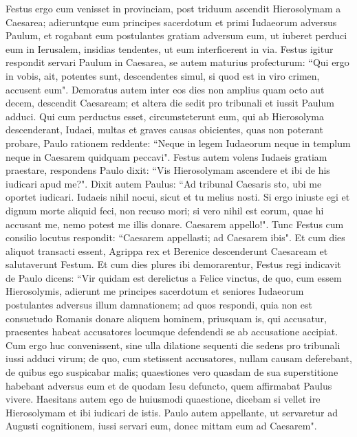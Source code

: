 \begin{biblechapter}  
\verse Festus ergo cum venisset in provinciam, post triduum ascendit Hierosolymam a Caesarea; 
\verse adieruntque eum principes sacerdotum et primi Iudaeorum adversus Paulum, et rogabant eum 
\verse postulantes gratiam adversum eum, ut iuberet perduci eum in Ierusalem, insidias tendentes, ut eum interficerent in via. 
\verse Festus igitur respondit servari Paulum in Caesarea, se autem maturius profecturum: 
\verse “Qui ergo in vobis, ait, potentes sunt, descendentes simul, si quod est in viro crimen, accusent eum". 
\verse Demoratus autem inter eos dies non amplius quam octo aut decem, descendit Caesaream; et altera die sedit pro tribunali et iussit Paulum adduci. 
\verse Qui cum perductus esset, circumsteterunt eum, qui ab Hierosolyma descenderant, Iudaei, multas et graves causas obicientes, quas non poterant probare, 
\verse Paulo rationem reddente: “Neque in legem Iudaeorum neque in templum neque in Caesarem quidquam peccavi". 
\verse Festus autem volens Iudaeis gratiam praestare, respondens Paulo dixit: “Vis Hierosolymam ascendere et ibi de his iudicari apud me?". 
\verse Dixit autem Paulus: “Ad tribunal Caesaris sto, ubi me oportet iudicari. Iudaeis nihil nocui, sicut et tu melius nosti. 
\verse Si ergo iniuste egi et dignum morte aliquid feci, non recuso mori; si vero nihil est eorum, quae hi accusant me, nemo potest me illis donare. Caesarem appello!". 
\verse Tunc Festus cum consilio locutus respondit: “Caesarem appellasti; ad Caesarem ibis". 
\verse Et cum dies aliquot transacti essent, Agrippa rex et Berenice descenderunt Caesaream et salutaverunt Festum. 
\verse Et cum dies plures ibi demorarentur, Festus regi indicavit de Paulo dicens: “Vir quidam est derelictus a Felice vinctus, 
\verse de quo, cum essem Hierosolymis, adierunt me principes sacerdotum et seniores Iudaeorum postulantes adversus illum damnationem; 
\verse ad quos respondi, quia non est consuetudo Romanis donare aliquem hominem, priusquam is, qui accusatur, praesentes habeat accusatores locumque defendendi se ab accusatione accipiat. 
\verse Cum ergo huc convenissent, sine ulla dilatione sequenti die sedens pro tribunali iussi adduci virum; 
\verse de quo, cum stetissent accusatores, nullam causam deferebant, de quibus ego suspicabar malis; 
\verse quaestiones vero quasdam de sua superstitione habebant adversus eum et de quodam Iesu defuncto, quem affirmabat Paulus vivere. 
\verse Haesitans autem ego de huiusmodi quaestione, dicebam si vellet ire Hierosolymam et ibi iudicari de istis. 
\verse Paulo autem appellante, ut servaretur ad Augusti cognitionem, iussi servari eum, donec mittam eum ad Caesarem". 

\end{biblechapter}
